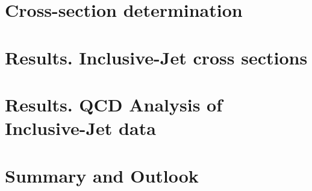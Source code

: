 \documentclass[12pt,a4paper,reqno,twoside,final]{scrbook}%
\numberwithin{equation}{subsection}
\begin{document}
\chapter{Cross-section determination}
\label{ch:unfolding}


\chapter{Results. Inclusive-Jet cross sections}
\label{ch:resultscs}


\chapter{Results. QCD Analysis of Inclusive-Jet data}
\label{ch:resultsqcdfit}


\chapter*{Summary and Outlook}
\label{ch:summary}


\end{document}
